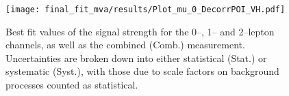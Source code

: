 \begin{figure}[ht]
	\centering
	\texttt{[image: final\_fit\_mva/results/Plot\_mu\_0\_DecorrPOI\_VH.pdf]}
  \caption[Best fit values for signal strength broken down by analysis
  channel.]{Best fit values of the signal strength for the 0--, 1-- and
    2--lepton channels, as well as the combined (Comb.) measurement.
    Uncertainties are broken down into either statistical (Stat.) or systematic
    (Syst.), with those due to scale factors on background processes counted as
    statistical.}
  \label{fig:channel-mus}
\end{figure}
